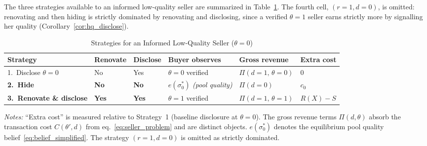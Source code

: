 \documentclass[10pt,letterpaper]{bp-template-concise}
\begin{document}
The three strategies available to an informed low-quality seller are summarized in
Table~\ref{tab:strategies}. The fourth cell, $(r=1, d=0)$, is omitted: renovating
and then hiding is strictly dominated by renovating and disclosing, since a verified
$\theta=1$ seller earns strictly more by signalling her quality (Corollary~\ref{cor:hq_disclose}).

\begin{table}[H]
\centering
\caption{Strategies for an Informed Low-Quality Seller ($\theta=0$)}
\label{tab:strategies}
\small
\renewcommand{\arraystretch}{1.4}
\begin{tabular}{llllll}
\toprule\toprule
\textbf{Strategy} & \textbf{Renovate} & \textbf{Disclose}
    & \textbf{Buyer observes} & \textbf{Gross revenue} & \textbf{Extra cost} \\
\midrule
1.\ Disclose $\theta=0$
    & No & Yes & $\theta=0$ verified
    & $\Pi(d=1,\,\theta=0)$ & $0$ \\[3pt]
\textbf{2.\ Hide}
    & \textbf{No} & \textbf{No} & $e(\sigma_0^*)$ \emph{(pool quality)}
    & $\Pi(d=0)$ & $c_0$ \\[3pt]
\textbf{3.\ Renovate \& disclose}
    & \textbf{Yes} & \textbf{Yes} & $\theta=1$ verified
    & $\Pi(d=1,\,\theta=1)$ & $R(X)-S$ \\
\bottomrule\bottomrule
\end{tabular}
\vspace{0.5em}

\raggedright
\footnotesize
\textit{Notes:} ``Extra cost'' is measured relative to Strategy~1 (baseline disclosure
at $\theta=0$). The gross revenue terms $\Pi(d,\theta)$ absorb the transaction cost
$C(\theta',d)$ from eq.~\eqref{eq:seller_problem} and are distinct objects.
$e(\sigma_0^*)$ denotes the equilibrium pool quality belief~\eqref{eq:belief_simplified}.
The strategy $(r=1, d=0)$ is omitted as strictly dominated.\footnotemark
\end{table}

\vspace{-1em}

\end{document}
